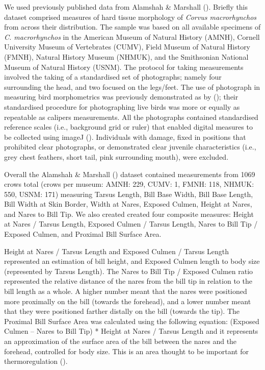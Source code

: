 \documentclass[10pt,a4paper]{article}
\begin{document}
We used previously published data from Alamshah \& Marshall ().
Briefly this dataset comprised measures of hard tissue morphology of \emph{Corvus macrorhynchos} from across their distribution.
The sample was based on all available specimens of \emph{C. macrorhynchos} in the American Museum of Natural History (AMNH), Cornell University Museum of Vertebrates (CUMV), Field Museum of Natural History (FMNH), Natural History Museum (NHMUK), and the Smithsonian National Museum of Natural History (USNM).
The protocol for taking measurements involved the taking of a standardised set of photographs; namely four surrounding the head, and two focused on the legs/feet.
The use of photograph in measuring bird morphometrics was previously demonstrated as by (); their standardised procedure for photographing live birds was more or equally as repeatable as calipers measurements.
All the photographs contained standardised reference scales (i.e., background grid or ruler) that enabled digital measures to be collected using imageJ ().
Individuals with damage, fixed in positions that prohibited clear photographs, or demonstrated clear juvenile characteristics (i.e., grey chest feathers, short tail, pink surrounding mouth), were excluded.

Overall the Alamshah \& Marshall () dataset contained measurements from 1069 crows total (crows per museum: AMNH: 229, CUMV: 1, FMNH: 118, NHMUK: 550, USNM: 171) measuring Tarsus Length, Bill Base Width, Bill Base Length, Bill Width at Skin Border, Width at Nares, Exposed Culmen, Height at Nares, and Nares to Bill Tip.
We also created created four composite measures: Height at Nares / Tarsus Length, Exposed Culmen / Tarsus Length, Nares to Bill Tip / Exposed Culmen, and Proximal Bill Surface Area.

Height at Nares / Tarsus Length and Exposed Culmen / Tarsus Length represented an estimation of bill height, and Exposed Culmen length to body size (represented by Tarsus Length).
The Nares to Bill Tip / Exposed Culmen ratio represented the relative distance of the nares from the bill tip in relation to the bill length as a whole.
A higher number meant that the nares were positioned more proximally on the bill (towards the forehead), and a lower number meant that they were positioned farther distally on the bill (towards the tip).
The Proximal Bill Surface Area was calculated using the following equation: (Exposed Culmen -- Nares to Bill Tip) * Height at Nares / Tarsus Length and it represents an approximation of the surface area of the bill between the nares and the forehead, controlled for body size.
This is an area thought to be important for thermoregulation ().
\end{document}
